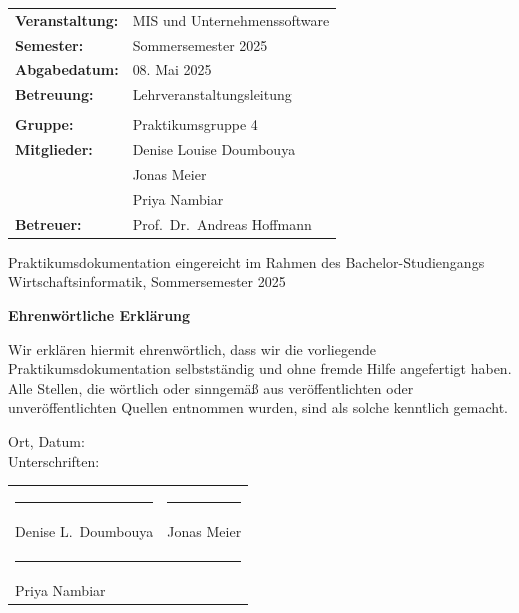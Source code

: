 \documentclass[12pt, a4paper, twoside]{report}
\begin{document}
\begin{titlepage}
  \begin{center}
    \begin{tabular}{ll}
      \textbf{Veranstaltung:}  & MIS und Unternehmenssoftware \\[4pt]
      \textbf{Semester:}       & Sommersemester 2025 \\[4pt]
      \textbf{Abgabedatum:}    & 08. Mai 2025 \\[4pt]
      \textbf{Betreuung:}      & Lehrveranstaltungsleitung \\[8pt]
      \hline\\[-4pt]
      \textbf{Gruppe:}         & Praktikumsgruppe 4 \\[4pt]
      \textbf{Mitglieder:}     & Denise Louise Doumbouya \\[2pt]
                               & Jonas Meier \\[2pt]
                               & Priya Nambiar \\[4pt]
      \textbf{Betreuer:}       & Prof.\ Dr.\ Andreas Hoffmann \\
    \end{tabular}
  \end{center}

  \vfill
  \begin{center}
    {\small\color{gray} Praktikumsdokumentation eingereicht im Rahmen des Bachelor-Studiengangs\\
    Wirtschaftsinformatik, Sommersemester 2025}
  \end{center}
\end{titlepage}

\cleardoublepage
\thispagestyle{empty}
\vspace*{3cm}
\begin{center}
  \textbf{\large Ehrenwörtliche Erklärung}
\end{center}
\vspace{1cm}
Wir erklären hiermit ehrenwörtlich, dass wir die vorliegende Praktikumsdokumentation selbstständig
und ohne fremde Hilfe angefertigt haben. Alle Stellen, die wörtlich oder sinngemäß aus
veröffentlichten oder unveröffentlichten Quellen entnommen wurden, sind als solche kenntlich gemacht.

\vspace{2cm}
\begin{flushleft}
  Ort, Datum: \underline{\hspace{6cm}} \\[1.5cm]
  Unterschriften: \\[2cm]
  \begin{tabular}{p{5cm} p{5cm}}
    \rule{4.5cm}{0.4pt} & \rule{4.5cm}{0.4pt} \\
    Denise L.\ Doumbouya & Jonas Meier \\[1.5cm]
    \multicolumn{2}{l}{\rule{4.5cm}{0.4pt}} \\
    \multicolumn{2}{l}{Priya Nambiar}
  \end{tabular}
\end{flushleft}
\end{document}
